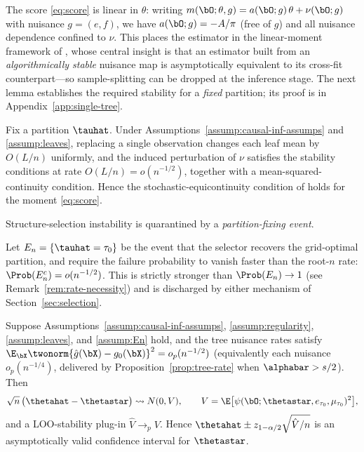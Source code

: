 The score \eqref{eq:score} is linear in $\theta$: writing
$m(\bO; \theta, g) = a(\bO; g)\,\theta + \nu(\bO; g)$ with nuisance $g = (e, f)$, we
have $a(\bO; g) = -A/\pi$ (free of $g$) and all nuisance dependence confined to
$\nu$. This places the estimator in the linear-moment framework of
\citet{chen2022dml}, whose central insight is that an estimator built from an
\emph{algorithmically stable} nuisance map is asymptotically equivalent to its
cross-fit counterpart---so sample-splitting can be dropped at the inference stage.
The next lemma establishes the required stability for a \emph{fixed} partition; its
proof is in Appendix~\ref{app:single-tree}.

\begin{lemma}
\label{lem:leaf-stability}
Fix a partition $\tauhat$. Under Assumptions~\ref{assump:causal-inf-assumps} and
\ref{assump:leaves}, replacing a single observation changes each leaf mean by
$O(L / n)$ uniformly, and the induced perturbation of $\nu$ satisfies the
\citet{chen2022dml} stability conditions at rate $O(L / n) = o(n^{-1/2})$, together
with a mean-squared-continuity condition. Hence the stochastic-equicontinuity
condition of \citet{chen2022dml} holds for the moment \eqref{eq:score}.
\end{lemma}

Structure-selection instability is quarantined by a \emph{partition-fixing event}.

\begin{assumption}
\label{assump:En}
Let $E_n = \{\tauhat = \tau_0\}$ be the event that the selector recovers the
grid-optimal partition, and require the failure probability to vanish faster than the
root-$n$ rate: $\Prob(E_n^c) = o(n^{-1/2})$. This is strictly stronger than
$\Prob(E_n) \to 1$ (see Remark~\ref{rem:rate-necessity}) and is discharged by either
mechanism of Section~\ref{sec:selection}.
\end{assumption}

\begin{theorem}
\label{thm:wm-clt}
Suppose Assumptions~\ref{assump:causal-inf-assumps}, \ref{assump:regularity},
\ref{assump:leaves}, and \ref{assump:En} hold, and the tree nuisance rates satisfy
$\E_{\bX}\twonorm{\hat g(\bX) - g_0(\bX)}^2 = o_p(n^{-1/2})$ (equivalently each
nuisance $o_p(n^{-1/4})$, delivered by Proposition~\ref{prop:tree-rate} when
$\alphabar > s/2$). Then
\begin{equation}
\label{eq:wm-clt}
\sqrt{n}\,\bigl(\thetahat - \thetastar\bigr) \leadsto N(0, V),
\qquad
V = \E\bigl[\psi(\bO; \thetastar, e_{\tau_0}, \mu_{\tau_0})^2\bigr],
\end{equation}
and a LOO-stability plug-in $\hat V \to_p V$. Hence
$\thetahat \pm z_{1-\alpha/2}\sqrt{\hat V / n}$ is an asymptotically valid confidence
interval for $\thetastar$.
\end{theorem}

